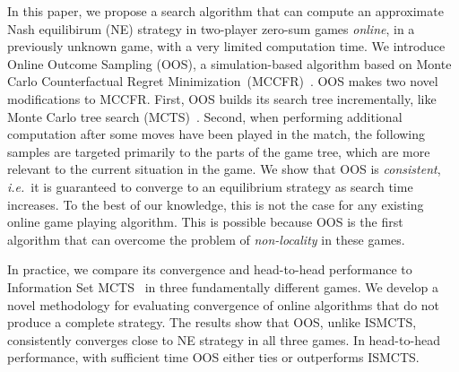 \documentclass{aamas2015}
\newcommand{\ie}{{\it i.e.}~}
\begin{document}
In this paper, we propose a search algorithm that can compute an approximate Nash equilibirum (NE) strategy in two-player zero-sum games {\it online}, in a previously unknown game, with a very limited computation time. 
We introduce Online Outcome Sampling (OOS), a simulation-based algorithm based on Monte Carlo Counterfactual Regret Minimization~(MCCFR)~\cite{Lanctot09Sampling}. 
OOS makes two novel modifications to MCCFR. First, OOS builds its search tree incrementally, like Monte Carlo tree search 
(MCTS)~\cite{Coulom06Efficient,mctssurvey,UCT}. Second, when performing additional computation after some moves have been played in the match, the following samples are targeted primarily to the parts of the game tree, which are more relevant to the current situation in the game.
We show that OOS is {\it consistent}, \ie it is guaranteed to converge to an equilibrium strategy as search time increases. To the best of our knowledge, this is not the case for any existing online game playing algorithm. This is possible because OOS is the first algorithm that can overcome the problem of \emph{non-locality} in these games.

In practice, we compare its convergence and head-to-head performance to Information Set 
MCTS~\cite{Cowling12ISMCTS,Whitehouse13Integrating,Lisy14selection} in three fundamentally different games. 
We develop a novel methodology for evaluating convergence of online algorithms that do not produce a complete strategy. 
The results show that OOS, unlike ISMCTS, consistently converges close to NE strategy in all three games. In head-to-head performance, with sufficient time OOS either ties or outperforms ISMCTS. 

\end{document}
